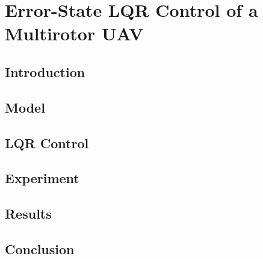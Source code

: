 
\chapter{Error-State LQR Control of a Multirotor UAV}
\label{chp:control_paper}

\graphicspath{{lqr_paper/}}

\section{Introduction}




\section{Model} \label{sec:model}


%


\section{LQR Control} \label{sec:lqr_control}


%

\section{Experiment} \label{sec:experiment}




\section{Results} \label{sec:results}



\section{Conclusion} \label{sec:conclusion}


